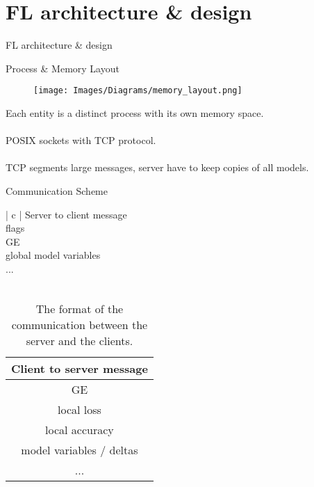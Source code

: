 \setlength{\parskip}{\baselineskip}
\section[FL architecture]{FL architecture \& design}

\begin{frame}
	\huge FL architecture \& design
\end{frame}

\begin{frame}{Process \& Memory Layout}
	\begin{minipage}{0.4\textwidth}
        \begin{figure}[H]
            \centering
                \texttt{[image: Images/Diagrams/memory\_layout.png]}
        \end{figure}
    \end{minipage}%
	\begin{minipage}{0.6\textwidth}
	    Each entity is a distinct process with its own memory space.\\\\
	    POSIX sockets with TCP protocol.\\\\
	    TCP segments large messages, server have to keep copies of all models.
    \end{minipage}
\end{frame}

\begin{frame}{Communication Scheme}
	\begin{table}[H]
        \center
        \begin{tabular}{ | c | }
            \hline
            Server to client message\\
            \hline\hline
            flags\\
            \hline
            GE\\
            \hline
            global model variables\\
            ...\\
            \hline
             \\
        \end{tabular}
        \quad
        \begin{tabular}{ | c | }
            \hline
            Client to server message\\
            \hline\hline
            GE\\
            \hline
            local loss\\
            \hline
            local accuracy\\
            \hline
            model variables / deltas\\
            ...\\
            \hline
        \end{tabular}
        \caption[Communication Scheme]{The format of the communication between the server and the clients.}
    \end{table}
\end{frame}

